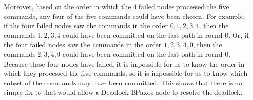 Moreover, based on the order in which the $4$ failed nodes processed the five
commands, any four of the five commands could have been chosen. For example, if
the four failed nodes saw the commands in the order $0, 1, 2, 3, 4$, then the
commands $1, 2, 3, 4$ could have been committed on the fast path in round 0.
Or, if the four failed nodes saw the commands in the order $1, 2, 3, 4, 0$,
then the commands $2, 3, 4, 0$ could have been committed on the fast path in
round 0. Because these four nodes have failed, it is impossible for us to know
the order in which they processed the five commands, so it is impossible for us
to know which subset of the commands may have been committed. This shows that
there is no simple fix to  that would allow a Deadlock
BPaxos node to resolve the deadlock.

